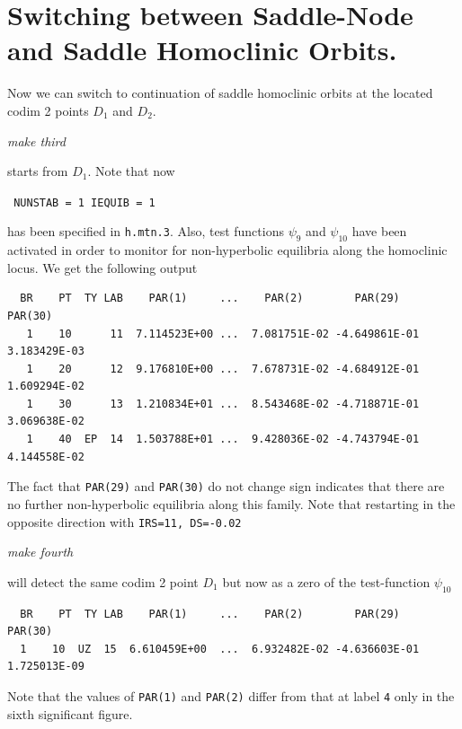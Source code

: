 \documentclass[12pt]{report}
\begin{document}
\section{Switching between Saddle-Node and Saddle Homoclinic Orbits.}
Now we can switch to continuation of saddle homoclinic orbits at the
located codim 2 points $D_1$ and $D_2$. 
\begin{center}
{\it make third}
\end{center}
starts from $D_1$. Note that now 
\begin{center}
{\tt 
NUNSTAB = 1 \quad IEQUIB = 1}  
\end{center}
has been specified in {\tt h.mtn.3}. Also, test functions $\psi_9$
and $\psi_{10}$ have been activated in order
to monitor for non-hyperbolic equilibria along the homoclinic locus. 
We get the following output
\begin{verbatim}
  BR    PT  TY LAB    PAR(1)     ...    PAR(2)        PAR(29)       PAR(30)    
   1    10      11  7.114523E+00 ...  7.081751E-02 -4.649861E-01  3.183429E-03
   1    20      12  9.176810E+00 ...  7.678731E-02 -4.684912E-01  1.609294E-02
   1    30      13  1.210834E+01 ...  8.543468E-02 -4.718871E-01  3.069638E-02
   1    40  EP  14  1.503788E+01 ...  9.428036E-02 -4.743794E-01  4.144558E-02
\end{verbatim}
The fact that {\tt PAR(29)} and {\tt PAR(30)} do not change sign indicates 
that there are no further non-hyperbolic equilibria
along this family. Note that restarting in the opposite direction with {\tt IRS=11,
DS=-0.02} 
\begin{center}
{\it make fourth}
\end{center}
will detect the same codim 2 point $D_1$ but now as a zero
of the test-function $\psi_{10}$
\begin{verbatim}
  BR    PT  TY LAB    PAR(1)     ...    PAR(2)        PAR(29)       PAR(30)
  1    10  UZ  15  6.610459E+00  ...  6.932482E-02 -4.636603E-01  1.725013E-09    
\end{verbatim}
Note that the values of {\tt PAR(1)} and {\tt PAR(2)} differ from that at label {\tt 4} 
only in the sixth significant figure. 
\end{document}

